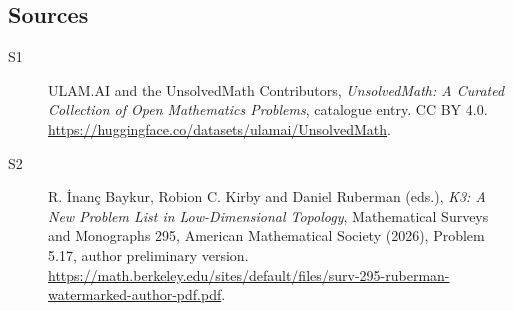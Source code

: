 \documentclass[11pt]{article}
\begin{document}
\subsection{Sources}
\begin{description}
\item[\hypertarget{source:statement:1}{S1}] ULAM.AI and the UnsolvedMath Contributors, \emph{UnsolvedMath: A Curated Collection of Open Mathematics Problems}, catalogue entry. CC BY 4.0. \url{https://huggingface.co/datasets/ulamai/UnsolvedMath}.
\item[\hypertarget{source:statement:2}{S2}] R. İnanç Baykur, Robion C. Kirby and Daniel Ruberman (eds.), \emph{K3: A New Problem List in Low-Dimensional Topology}, Mathematical Surveys and Monographs 295, American Mathematical Society (2026), Problem 5.17, author preliminary version. \url{https://math.berkeley.edu/sites/default/files/surv-295-ruberman-watermarked-author-pdf.pdf}.
\end{description}
\label{end:statement}
\end{document}
